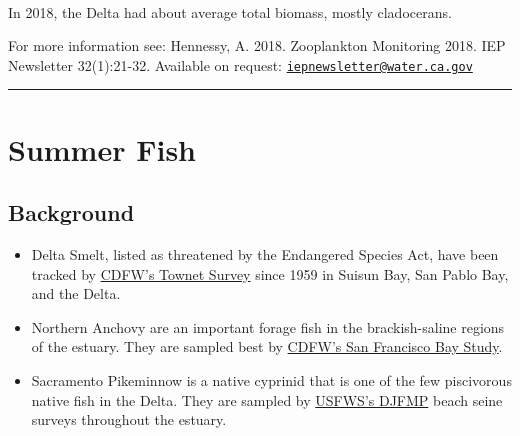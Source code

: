\documentclass[
]{book}
\providecommand{\tightlist}{%
  \setlength{\itemsep}{0pt}\setlength{\parskip}{0pt}}
\begin{document}
\begin{panel-grid}
\begin{columns-nocenter}
\begin{column40}

~

\end{column40}

\begin{column800}

In 2018, the Delta had about average total biomass, mostly cladocerans.

\end{column800}

\end{columns-nocenter}

\end{panel-grid}

\begin{disclaimer}
For more information see: Hennessy, A. 2018. Zooplankton Monitoring
2018. IEP Newsletter 32(1):21-32. Available on request:
\href{mailto:iepnewsletter@water.ca.gov}{\nolinkurl{iepnewsletter@water.ca.gov}}
\end{disclaimer}

\begin{center}\rule{0.5\linewidth}{0.5pt}\end{center}

\hypertarget{summer-fish}{%
\section{Summer Fish}\label{summer-fish}}

\hypertarget{background-4}{%
\subsection{Background}\label{background-4}}

\begin{itemize}
\tightlist
\item
  Delta Smelt, listed as threatened by the Endangered Species Act, have been tracked by \href{https://wildlife.ca.gov/Conservation/Delta/Townet-Survey}{CDFW's Townet Survey} since 1959 in Suisun Bay, San Pablo Bay, and the Delta.
\item
  Northern Anchovy are an important forage fish in the brackish-saline regions of the estuary. They are sampled best by \href{https://wildlife.ca.gov/Conservation/Delta/Bay-Study}{CDFW's San Francisco Bay Study}.
\item
  Sacramento Pikeminnow is a native cyprinid that is one of the few piscivorous native fish in the Delta. They are sampled by \href{https://www.fws.gov/lodi/juvenile_fish_monitoring_program/jfmp_index.htm}{USFWS's DJFMP} beach seine surveys throughout the estuary.
\end{itemize}
\end{document}
